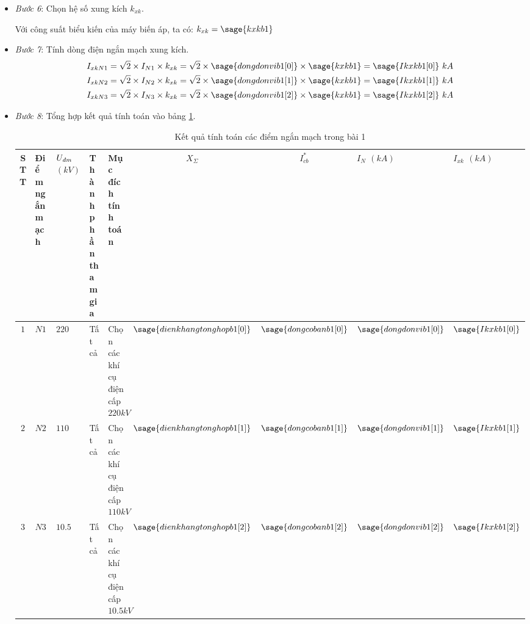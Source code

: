 \documentclass[12pt,a4paper]{article}
\newcommand{\viss}[1]{#1_\text{\textit{đm}}} %
\newcommand{\unit}[1]{~#1}							%
\newcommand{\pfm}[1]{\left({#1}\right)} %
\begin{document}
\begin{itemize}
\begin{itemize}
			\item \textit{Bước 6}: Chọn hệ số xung kích $k_{xk}$.
			
			Với công suất biểu kiến của máy biến áp, ta có: $k_{xk} = \sage{kxkb1}$
			
			\item \textit{Bước 7}: Tính dòng điện ngắn mạch xung kích.
				\begin{align*}					
						I_{xk N1} & = \sqrt{2}\times I_{N1}\times k_{xk} = \sqrt{2}\times \sage{dongdonvib1[0]} \times \sage{kxkb1} = \sage{Ikxkb1[0]} \unit{kA}\\
						I_{xk N2} & = \sqrt{2}\times I_{N2}\times k_{xk} = \sqrt{2}\times \sage{dongdonvib1[1]} \times \sage{kxkb1} = \sage{Ikxkb1[1]} \unit{kA}\\
						I_{xk N3} & = \sqrt{2}\times I_{N3}\times k_{xk} = \sqrt{2}\times \sage{dongdonvib1[2]} \times \sage{kxkb1} = \sage{Ikxkb1[2]} \unit{kA}
				\end{align*}	
				
				\item \textit{Bước 8}: Tổng hợp kết quả tính toán vào bảng \ref{Tab:tonghop-ketqua-b1}.
					\begin{table}[!h]
					\begin{normalsize}
						\begin{center}
							\begin{tabular}{|c|p{}|p{1cm}|p{1.5cm}|p{3cm}|c|c|p{1.3cm}|p{1.5cm}|}\hline
								STT & Điểm ngắn mạch & $\viss{U}$ $\pfm{kV}$ & Thành phần tham gia & Mục đích tính toán & $X_\Sigma$ & $I_{cb}^\ast$ & $I_N$ $\pfm{kA}$ & $I_{xk}$ $\pfm{kA}$\\ \hline
							$1$ & $N1$ & $220$ & Tất cả & Chọn các khí cụ điện cấp $220kV$ & $\sage{dienkhangtonghopb1[0]}$  & $\sage{dongcobanb1[0]}$ & $\sage{dongdonvib1[0]}$ & $\sage{Ikxkb1[0]}$\\ \hline
							$2$ & $N2$ & $110$ & Tất cả & Chọn các khí cụ điện cấp $110kV$ & $\sage{dienkhangtonghopb1[1]}$  & $\sage{dongcobanb1[1]}$ & $\sage{dongdonvib1[1]}$ & $\sage{Ikxkb1[1]}$\\ \hline
							
							$3$ & $N3$ & $10.5$ & Tất cả & Chọn các khí cụ điện cấp $10.5kV$ & $\sage{dienkhangtonghopb1[2]}$  & $\sage{dongcobanb1[2]}$ & $\sage{dongdonvib1[2]}$ & $\sage{Ikxkb1[2]}$\\ \hline
							\end{tabular}
						\end{center}		
				\end{normalsize}
				\caption{Kết quả tính toán các điểm ngắn mạch trong bài 1} \label{Tab:tonghop-ketqua-b1}
				\end{table}
		\end{itemize}
\end{itemize}
\end{document}

